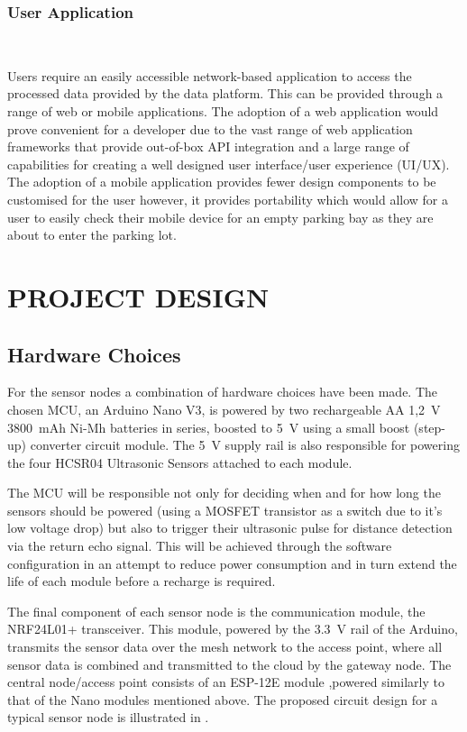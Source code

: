 \documentclass[10pt,twocolumn]{witseiepaper}
\begin{document}
		\subsubsection{User Application} $   $
		
			Users require an easily accessible network-based application to access the processed data provided by the data platform. This can be provided through a range of web or mobile applications. The adoption of a web application would prove convenient for a developer due to the vast range of web application frameworks that provide out-of-box API integration and a large range of capabilities for creating a well designed user interface/user experience (UI/UX). The adoption of a mobile application provides fewer design components to be customised for the user however, it provides portability which would allow for a user to easily check their mobile device for an empty parking bay as they are about to enter the parking lot.
			

\section{PROJECT DESIGN}
	\subsection{Hardware Choices} \label{hardware_choices}
	
		For the sensor nodes a combination of hardware choices have been made. The chosen MCU, an Arduino Nano V3, is powered by two rechargeable AA 1,2~V 3800~mAh \mbox{Ni-Mh} batteries in series, boosted to 5~V using a small boost (step-up) converter circuit module. The 5~V supply rail is also responsible for powering the four HCSR04 Ultrasonic Sensors attached to each module. 
		
		The MCU will be responsible not only for deciding when and for how long the sensors should be powered (using a MOSFET transistor as a switch due to it's low voltage drop) but also to trigger their ultrasonic pulse for distance detection via the return echo signal. This will be achieved through the software configuration in an attempt to reduce power consumption and in turn extend the life of each module before a recharge is required.
		
		The final component of each sensor node is the communication module, the NRF24L01+ transceiver. This module, powered by the 3.3~V rail of the Arduino, transmits the sensor data over the mesh network to the access point, where all sensor data is combined and transmitted to the cloud by the gateway node. The central node/access point consists of an ESP-12E module ,powered similarly to that of the Nano modules mentioned above. The proposed circuit design for a typical sensor node is illustrated in .
\end{document}
